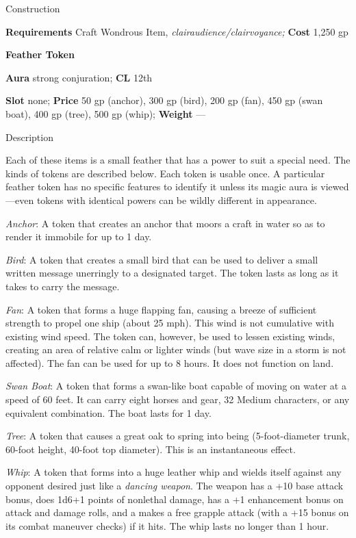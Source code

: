 Construction
				
\textbf{Requirements} Craft Wondrous Item,\textit{ clairaudience/clairvoyance;}\textbf{ Cost }1,250 gp
				
\textbf{Feather Token}
				
\textbf{Aura} strong conjuration;\textbf{ CL }12th
				
\textbf{Slot} none; \textbf{Price} 50 gp (anchor), 300 gp (bird), 200 gp (fan), 450 gp (swan boat), 400 gp (tree), 500 gp (whip); \textbf{Weight }---
				
Description
				
Each of these items is a small feather that has a power to suit a special need. The kinds of tokens are described below. Each token is usable once. A particular feather token has no specific features to identify it unless its magic aura is viewed---even tokens with identical powers can be wildly different in appearance.
				
\textit{Anchor}: A token that creates an anchor that moors a craft in water so as to render it immobile for up to 1 day.
				
\textit{Bird}: A token that creates a small bird that can be used to deliver a small written message unerringly to a designated target. The token lasts as long as it takes to carry the message.
				
\textit{Fan}: A token that forms a huge flapping fan, causing a breeze of sufficient strength to propel one ship (about 25 mph). This wind is not cumulative with existing wind speed. The token can, however, be used to lessen existing winds, creating an area of relative calm or lighter winds (but wave size in a storm is not affected). The fan can be used for up to 8 hours. It does not function on land.
				
\textit{Swan Boat}: A token that forms a swan-like boat capable of moving on water at a speed of 60 feet. It can carry eight horses and gear, 32 Medium characters, or any equivalent combination. The boat lasts for 1 day.
				
\textit{Tree}: A token that causes a great oak to spring into being (5-foot-diameter trunk, 60-foot height, 40-foot top diameter). This is an instantaneous effect.
				
\textit{Whip}: A token that forms into a huge leather whip and wields itself against any opponent desired just like a \textit{dancing weapon}. The weapon has a +10 base attack bonus, does 1d6+1 points of nonlethal damage, has a +1 enhancement bonus on attack and damage rolls, and a makes a free grapple attack (with a +15 bonus on its combat maneuver checks) if it hits. The whip lasts no longer than 1 hour. 
				
